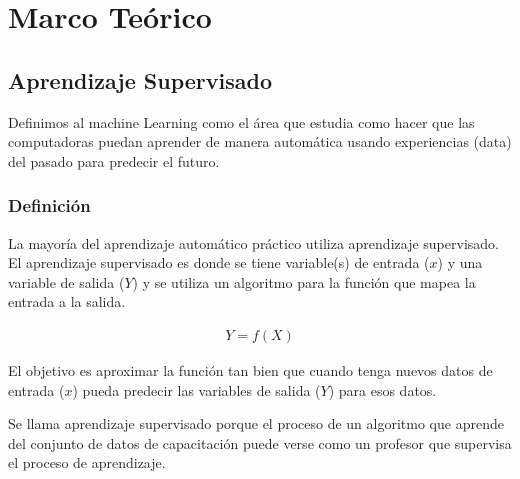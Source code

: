 \documentclass[12pt, fleqn]{report}                             %
\def \Eq {equation}                                             %
\newenvironment{MultiLineEquation}[1]                           %
        {\begin{\Eq}\begin{alignedat}{#1}}                          %
        {\end{alignedat}\end{\Eq}}                                  %
\newcommand \Quote              {\qq}                           %
\theoremstyle{break}                                            %
\begin{document}
\restoregeometry                                                    %
\nopagecolor                                                        %




\tableofcontents{}
\label{sec:Index}

\clearpage


\part{Marco Teórico}
\clearpage

  \chapter{Aprendizaje Supervisado}
        Definimos al machine Learning como el área que estudia como hacer que las computadoras puedan
        aprender de manera automática usando experiencias (data) del pasado para predecir el futuro.

        \section{Definición}

        La mayoría del aprendizaje automático práctico utiliza aprendizaje supervisado.
        El aprendizaje supervisado es donde se tiene variable(s) de entrada ($x$) y una variable 
        de salida ($Y$) y se utiliza un algoritmo para \Quote{aprender} la función que mapea la entrada 
        a la salida.

        \begin{MultiLineEquation}{3}
            Y = f (X)
        \end{MultiLineEquation}

        El objetivo es aproximar la función tan bien que cuando tenga nuevos datos de 
        entrada ($x$) pueda predecir las variables de salida ($Y$) para esos datos.

        Se llama aprendizaje supervisado porque el proceso de un algoritmo que aprende del 
        conjunto de datos de capacitación puede verse como un profesor que supervisa 
        el proceso de aprendizaje.
        
\end{document}
